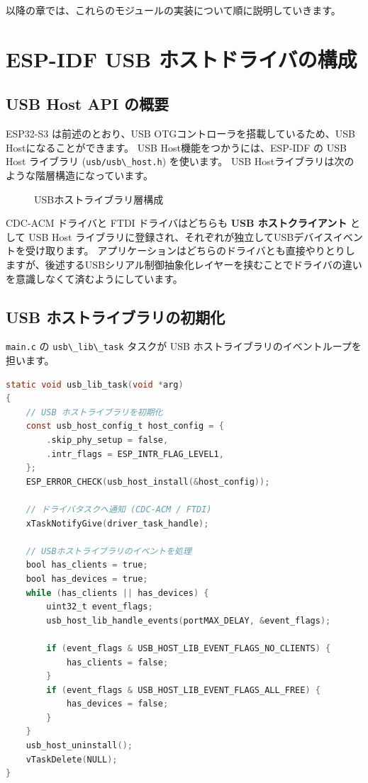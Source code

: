\documentclass[10pt,twoside,openany,a4j]{ltjsbook}
\newcommand{\passthrough}[1]{#1}
\newcommand{\pandocbounded}[1]{#1}
\begin{document}
以降の章では、これらのモジュールの実装について順に説明していきます。

\chapter{ESP-IDF USB
ホストドライバの構成}\label{esp-idf-usb-ux30dbux30b9ux30c8ux30c9ux30e9ux30a4ux30d0ux306eux69cbux6210}

\section{USB Host API の概要}\label{usb-host-api-ux306eux6982ux8981}

ESP32-S3 は前述のとおり、USB OTGコントローラを搭載しているため、USB
Hostになることができます。 USB Host機能をつかうには、ESP-IDF の USB Host
ライブラリ (\passthrough{\lstinline!usb/usb\_host.h!}) を使います。 USB
Hostライブラリは次のような階層構造になっています。

\begin{figure}
\centering
\pandocbounded{}
\caption{USBホストライブラリ層構成}\label{fig:usb_host_layers}
\end{figure}

CDC-ACM ドライバと FTDI ドライバはどちらも \textbf{USB
ホストクライアント} として USB Host
ライブラリに登録され、それぞれが独立してUSBデバイスイベントを受け取ります。
アプリケーションはどちらのドライバとも直接やりとりしますが、後述するUSBシリアル制御抽象化レイヤーを挟むことでドライバの違いを意識しなくて済むようにしています。

\section{USB
ホストライブラリの初期化}\label{usb-ux30dbux30b9ux30c8ux30e9ux30a4ux30d6ux30e9ux30eaux306eux521dux671fux5316}

\passthrough{\lstinline!main.c!} の
\passthrough{\lstinline!usb\_lib\_task!} タスクが USB
ホストライブラリのイベントループを担います。

\begin{lstlisting}[language=C]
static void usb_lib_task(void *arg)
{
    // USB ホストライブラリを初期化
    const usb_host_config_t host_config = {
        .skip_phy_setup = false,
        .intr_flags = ESP_INTR_FLAG_LEVEL1,
    };
    ESP_ERROR_CHECK(usb_host_install(&host_config));

    // ドライバタスクへ通知 (CDC-ACM / FTDI)
    xTaskNotifyGive(driver_task_handle);

    // USBホストライブラリのイベントを処理
    bool has_clients = true;
    bool has_devices = true;
    while (has_clients || has_devices) {
        uint32_t event_flags;
        usb_host_lib_handle_events(portMAX_DELAY, &event_flags);

        if (event_flags & USB_HOST_LIB_EVENT_FLAGS_NO_CLIENTS) {
            has_clients = false;
        }
        if (event_flags & USB_HOST_LIB_EVENT_FLAGS_ALL_FREE) {
            has_devices = false;
        }
    }
    usb_host_uninstall();
    vTaskDelete(NULL);
}
\end{lstlisting}
\end{document}
